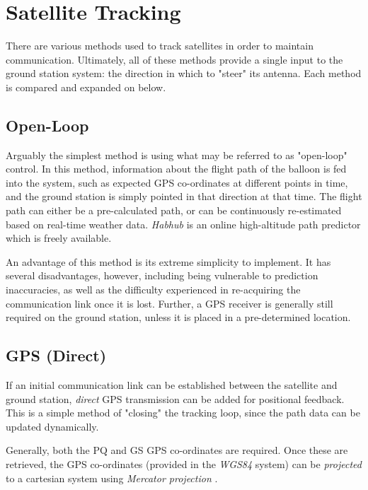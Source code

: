 \graphicspath{{./figures/}}

\section{Satellite Tracking}
There are various methods used to track satellites in order to maintain communication. Ultimately, all of these methods provide a single input to the ground station system: the direction in which to "steer" its antenna. Each method is compared and expanded on below.

\subsection{Open-Loop}
Arguably the simplest method is using what may be referred to as "open-loop" control. In this method, information about the flight path of the balloon is fed into the system, such as expected GPS co-ordinates at different points in time, and the ground station is simply pointed in that direction at that time. The flight path can either be a pre-calculated path, or can be continuously re-estimated based on real-time weather data. \textit{Habhub} is an online high-altitude path predictor \cite{site-stratoballooningPredictionTracking} which is freely available.

An advantage of this method is its extreme simplicity to implement. It has several disadvantages, however, including being vulnerable to prediction inaccuracies, as well as the difficulty experienced in re-acquiring the communication link once it is lost. Further, a GPS receiver is generally still required on the ground station, unless it is placed in a pre-determined location.

\subsection{GPS (Direct)}
If an initial communication link can be established between the satellite and ground station, \textit{direct} GPS transmission can be added for positional feedback. This is a simple method of "closing" the tracking loop, since the path data can be updated dynamically.

Generally, both the PQ and GS GPS co-ordinates are required. Once these are retrieved, the GPS co-ordinates (provided in the \textit{WGS84} system) can be \textit{projected} to a cartesian system using \textit{Mercator projection} \cite{site-mercator}.

